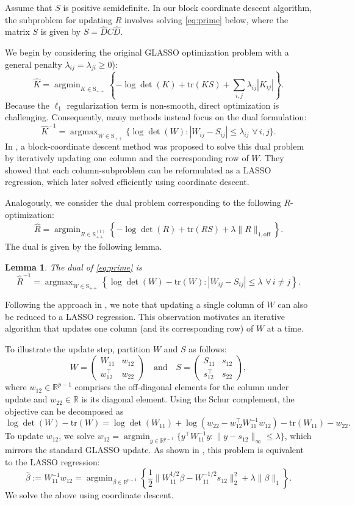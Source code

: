 \documentclass[12pt]{amsart}
\numberwithin{equation}{section}
\numberwithin{equation}{section}
\theoremstyle{plain}
\newtheorem{lemma}{Lemma}
\theoremstyle{definition}
\DeclareMathOperator*{\argmin}{\arg\min}
\DeclareMathOperator*{\argmax}{\arg\max}
\newcommand{\tr}{\mathrm{tr}}
\newcommand{\Spp}{\mathrm{S}_{++}}
\newcommand{\Sppone}{\mathrm{S}_{++}^{(1)}}
\newcommand{\R}{\mathbb{R}}
\begin{document}
Assume that $S$ is positive semidefinite. In our block coordinate descent algorithm, the subproblem for updating $R$ involves solving \eqref{eq:prime} below, where the matrix $S$ is given by $S=\hat{D}C\hat{D}$. 

We begin by considering the original GLASSO optimization problem with a general penalty $\lambda_{ij}=\lambda_{ji}\geq0$):
\[
\hat{K} = \argmin_{K\in\Spp} \left\{ -\log\det(K)+\tr(K S)+\sum_{i,j} \lambda_{ij} |K_{ij}|\right\}. 
\]
Because the $\ell_1$ regularization term is non-smooth, direct optimization is challenging. Consequently, many methods instead focus on the dual formulation:
\[
\hat{K}^{-1} = \argmax_{W\in\Spp}\{\log\det(W)\colon |W_{ij}-S_{ij}|\leq \lambda_{ij} \,\, \forall\,i,j\}.
\]
In \cite{Banerjee}, a block-coordinate descent method was proposed to solve this dual problem by iteratively updating one column and the corresponding row of $W$. They showed that each column-subproblem can be reformulated as a LASSO regression, which \cite{friedman2008sparse} later solved efficiently using coordinate descent.

Analogously, we consider the dual problem corresponding to the following $R$-op\-ti\-mi\-za\-tion:
\begin{align}\label{eq:prime}
\hat{R} = \argmin_{R\in\Sppone} \left\{ -\log\det(R)+\tr(R S)+\lambda \|R\|_{1,\mathrm{off}}\right\}.
\end{align}
The dual is given by the following lemma.
\begin{lemma}\label{lem:dual}
   The dual of \eqref{eq:prime} is 
\[
\hat{R}^{-1} = \argmax_{W\in\Spp}\left\{ \log\det(W)-\tr(W)\colon |W_{ij}-S_{ij}|\leq \lambda\, \,\forall\,i\neq j \right\}. 
\]
\end{lemma}
Following the approach in \cite{Banerjee}, we note that updating a single column of $W$ can also be reduced to a LASSO regression. This observation motivates an iterative algorithm that updates one column (and its corresponding row) of $W$ at a time.

To illustrate the update step, partition $W$ and $S$ as follows:
\[
W = \begin{pmatrix}
    W_{11} & w_{12} \\ w_{12}^\top & w_{22}
\end{pmatrix}\quad\mbox{and}\quad S = \begin{pmatrix}
    S_{11} & s_{12} \\ s_{12}^\top & s_{22}
\end{pmatrix},
\]
where $w_{12}\in\R^{p-1}$ comprises the off-diagonal elements for the column under update and $w_{22}\in\R$ is its diagonal element.
Using the Schur complement, the objective can be decomposed as
\[
\log\det(W) -\tr(W)=  \log\det(W_{11})+\log(w_{22}-w_{12}^\top W_{11}^{-1} w_{12}) -\tr(W_{11})-w_{22}. 
\]
To update $w_{12}$, we solve
$w_{12} = \argmin_{y\in \R^{p-1}} \{ y^\top W_{11}^{-1} y\colon \|y-s_{12}\|_\infty\leq \lambda \}$,
which mirrors the standard GLASSO update. As shown in \cite{Banerjee}, this problem is equivalent to the LASSO regression:
\[
\hat{\beta}:=W_{11}^{-1} w_{12} = \argmin_{\beta\in\R^{p-1}} \left\{ \frac12 \| W_{11}^{1/2} \beta - W_{11}^{-1/2}s_{12}\|_2^2 + \lambda \|\beta\|_1\right\}.
\]
We solve the above using coordinate descent.
\end{document}
